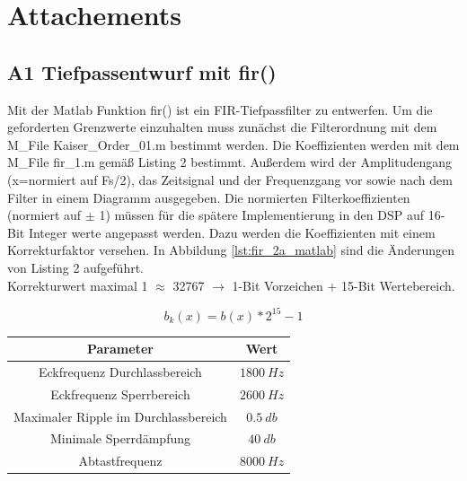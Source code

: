 \section{Attachements}
\subsection{A1 Tiefpassentwurf mit fir()}
Mit der Matlab Funktion fir() ist ein FIR-Tiefpassfilter zu entwerfen. Um die geforderten Grenzwerte einzuhalten muss zunächst die Filterordnung mit dem M\_File Kaiser\_Order\_01.m bestimmt werden. Die Koeffizienten werden mit dem M\_File fir\_1.m gemäß Listing 2 bestimmt. Außerdem wird der Amplitudengang (x=normiert auf Fs/2), das Zeitsignal und der Frequenzgang vor sowie nach dem Filter in einem Diagramm ausgegeben. Die normierten Filterkoeffizienten (normiert auf $\pm$ 1) müssen für die spätere Implementierung in den DSP auf 16-Bit Integer werte angepasst werden. Dazu werden die Koeffizienten mit einem Korrekturfaktor versehen. In Abbildung \ref{lst:fir_2a_matlab} sind die Änderungen von Listing 2 aufgeführt.\\Korrekturwert maximal 1 $\approx$ 32767 $\rightarrow$ 1-Bit Vorzeichen + 15-Bit Wertebereich.

\begin{equation}
b_{k}(x) = b(x) * 2^{15}-1
\end{equation}

\begin{table}[h]
	\centering
	\begin{tabular}{c | c}
		Parameter	& Wert	\\
		\hline
		Eckfrequenz Durchlassbereich			& $1800~Hz$	\\
		Eckfrequenz Sperrbereich				& $2600~Hz$	\\
		Maximaler Ripple im Durchlassbereich	& $0.5~db$	\\
		Minimale Sperrdämpfung					& $40~db$	\\
		Abtastfrequenz							& $8000~Hz$	\\
	\end{tabular}
\end{table}



\newpage



